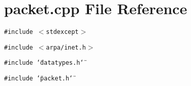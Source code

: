 \section{packet.cpp File Reference}
\label{packet_8cpp}
{\tt \#include $<$stdexcept$>$}\par
{\tt \#include $<$arpa/inet.h$>$}\par
{\tt \#include \char`\"{}datatypes.h\char`\"{}}\par
{\tt \#include \char`\"{}packet.h\char`\"{}}\par
